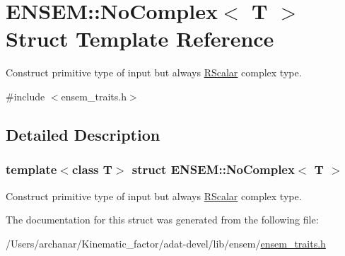 \hypertarget{structENSEM_1_1NoComplex}{}\section{E\+N\+S\+EM\+:\+:No\+Complex$<$ T $>$ Struct Template Reference}
\label{structENSEM_1_1NoComplex}


Construct primitive type of input but always \mbox{\hyperlink{classENSEM_1_1RScalar}{R\+Scalar}} complex type.  




{\ttfamily \#include $<$ensem\+\_\+traits.\+h$>$}



\subsection{Detailed Description}
\subsubsection*{template$<$class T$>$\newline
struct E\+N\+S\+E\+M\+::\+No\+Complex$<$ T $>$}

Construct primitive type of input but always \mbox{\hyperlink{classENSEM_1_1RScalar}{R\+Scalar}} complex type. 

The documentation for this struct was generated from the following file\+:\begin{DoxyCompactItemize}
\item 
/\+Users/archanar/\+Kinematic\+\_\+factor/adat-\/devel/lib/ensem/\mbox{\hyperlink{adat-devel_2lib_2ensem_2ensem__traits_8h}{ensem\+\_\+traits.\+h}}\end{DoxyCompactItemize}
